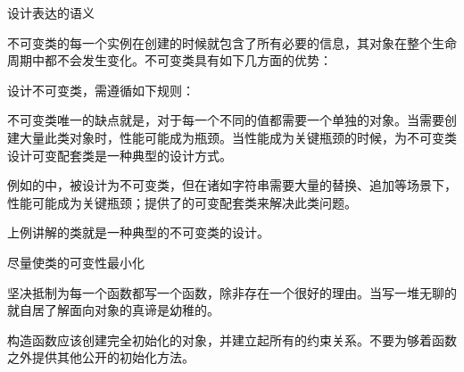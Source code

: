 \begin{content}

\begin{regulation}
设计表达的语义
\end{regulation}

不可变类的每一个实例在创建的时候就包含了所有必要的信息，其对象在整个生命周期中都不会发生变化。不可变类具有如下几方面的优势：
\begin{enum}
\end{enum}

设计不可变类，需遵循如下规则：
\begin{enum}
\end{enum}

不可变类唯一的缺点就是，对于每一个不同的值都需要一个单独的对象。当需要创建大量此类对象时，性能可能成为瓶颈。当性能成为关键瓶颈的时候，为不可变类设计可变配套类是一种典型的设计方式。

例如的中，被设计为不可变类，但在诸如字符串需要大量的替换、追加等场景下，性能可能成为关键瓶颈；提供了的可变配套类来解决此类问题。

上例讲解的类就是一种典型的不可变类的设计。

\begin{regulation}
尽量使类的可变性最小化
\end{regulation}

坚决抵制为每一个函数都写一个函数，除非存在一个很好的理由。当写一堆无聊的就自居了解面向对象的真谛是幼稚的。

构造函数应该创建完全初始化的对象，并建立起所有的约束关系。不要为够着函数之外提供其他公开的初始化方法。

\end{content}
